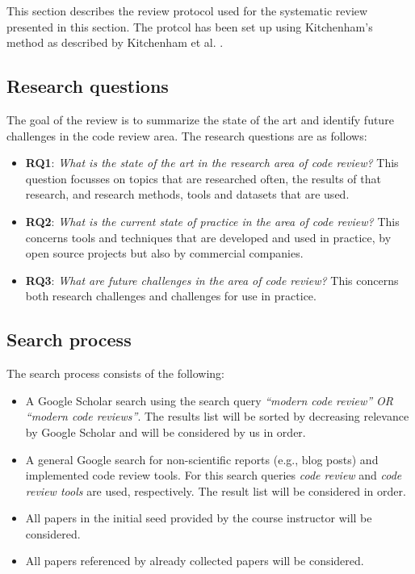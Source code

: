 \documentclass[]{book}
\providecommand{\tightlist}{%
  \setlength{\itemsep}{0pt}\setlength{\parskip}{0pt}}
\begin{document}
This section describes the review protocol used for the systematic
review presented in this section. The protcol has been set up using
Kitchenham's method as described by Kitchenham et al.
\citep{kitchenham2007}.

\subsection{Research questions}\label{research-questions-1}

The goal of the review is to summarize the state of the art and identify
future challenges in the code review area. The research questions are as
follows:

\begin{itemize}
\tightlist
\item
  \textbf{RQ1}: \emph{What is the state of the art in the research area
  of code review?} This question focusses on topics that are researched
  often, the results of that research, and research methods, tools and
  datasets that are used.
\item
  \textbf{RQ2}: \emph{What is the current state of practice in the area
  of code review?} This concerns tools and techniques that are developed
  and used in practice, by open source projects but also by commercial
  companies.
\item
  \textbf{RQ3}: \emph{What are future challenges in the area of code
  review?} This concerns both research challenges and challenges for use
  in practice.
\end{itemize}

\subsection{Search process}\label{search-process}

The search process consists of the following:

\begin{itemize}
\tightlist
\item
  A Google Scholar search using the search query \emph{``modern code
  review'' OR ``modern code reviews''}. The results list will be sorted
  by decreasing relevance by Google Scholar and will be considered by us
  in order.
\item
  A general Google search for non-scientific reports (e.g., blog posts)
  and implemented code review tools. For this search queries \emph{code
  review} and \emph{code review tools} are used, respectively. The
  result list will be considered in order.
\item
  All papers in the initial seed provided by the course instructor will
  be considered.
\item
  All papers referenced by already collected papers will be considered.
\end{itemize}
\end{document}
